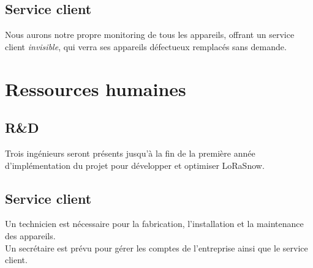 \subsection{Service client}
Nous aurons notre propre monitoring de tous les appareils, offrant un service client
\emph{invisible}, qui verra ses appareils défectueux remplacés sans demande.

\section{Ressources humaines}
\subsection{R\&D}
Trois ingénieurs seront présents jusqu'à la fin de la première année
d'implémentation du projet pour développer et optimiser LoRaSnow.

\subsection{Service client}
Un technicien est nécessaire pour la fabrication,
l'installation et la maintenance des appareils.\\
Un secrétaire est prévu pour gérer les comptes de l'entreprise
ainsi que le service client.
